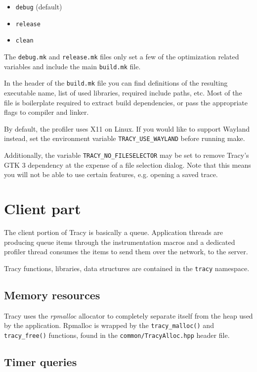 \documentclass[hidelinks,titlepage,a4paper]{article}
\begin{document}
\begin{itemize}
\item \texttt{debug} (default)
\item \texttt{release}
\item \texttt{clean}
\end{itemize}

The \texttt{debug.mk} and \texttt{release.mk} files only set a few of the optimization related variables and include the main \texttt{build.mk} file.

In the header of the \texttt{build.mk} file you can find definitions of the resulting executable name, list of used libraries, required include paths, etc. Most of the file is boilerplate required to extract build dependencies, or pass the appropriate flags to compiler and linker.

By default, the profiler uses X11 on Linux.  If you would like to support Wayland instead, set the environment variable \texttt{TRACY\_USE\_WAYLAND} before running make.

Additionally, the variable \texttt{TRACY\_NO\_FILESELECTOR} may be set to remove Tracy's GTK 3 dependency at the expense of a file selection dialog.  Note that this means you will not be able to use certain features, e.g. opening a saved trace.

\section{Client part}

The client portion of Tracy is basically a queue. Application threads are producing queue items through the instrumentation macros and a dedicated profiler thread consumes the items to send them over the network, to the server.

Tracy functions, libraries, data structures are contained in the \texttt{tracy} namespace.

\subsection{Memory resources}

Tracy uses the \emph{rpmalloc} allocator to completely separate itself from the heap used by the application. Rpmalloc is wrapped by the \texttt{tracy\_malloc()} and \texttt{tracy\_free()} functions, found in the \texttt{common/TracyAlloc.hpp} header file.

\subsection{Timer queries}
\label{timerqueries}
\end{document}

